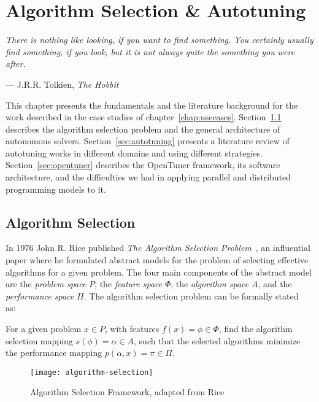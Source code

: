 \chapter{Algorithm Selection \& Autotuning}
\label{chap:autonomous}
\epigraph{\textit{There is nothing like looking, if you want to find something. You
certainly usually find something, if you look, but it is not always quite the
something you were after.}}{--- J.R.R. Tolkien, \textit{The Hobbit}}

This chapter presents the fundamentals and the literature background for the
work described in the case studies of chapter~\ref{chap:usecases}.
Section~\ref{sec:algselres} describes the algorithm selection problem and
the general architecture of autonomous solvers.
Section~\ref{sec:autotuning} presents a literature review of autotuning works
in different domains and using different strategies.
Section~\ref{sec:opentuner} describes the OpenTuner framework, its software
architecture, and the difficulties we had in applying parallel and distributed
programming models to it.

\section{Algorithm Selection}
\label{sec:algselres}

In 1976 John R. Rice published \textit{The Algorithm Selection
Problem}~\cite{rice1976algorithm}, an influential paper where he formulated
abstract models for the problem of selecting effective algorithms for a given
problem. The four main components of the abstract model are the \textit{problem
space} $P$, the \textit{feature space} $\Phi$, the \textit{algorithm space}
$A$, and the \textit{performance space} $\Pi$. The algorithm selection problem
can be formally stated~\cite{smith2009cross} as:

\begin{definition}
    For a given problem $x \in P$, with features $f(x) = \phi \in \Phi$,
    find the algorithm selection mapping $s(\phi) = \alpha \in A$, such
    that the selected algorithms minimize the performance mapping
    $p(\alpha,x) = \pi \in \Pi$.
\end{definition}

\begin{figure}[htpb]
    \begin{center}
        \texttt{[image: algorithm-selection]}
    \end{center}
    \caption{Algorithm Selection Framework, adapted from
    Rice~\cite{rice1976algorithm}}
    \label{fig:riceframe}
\end{figure}


